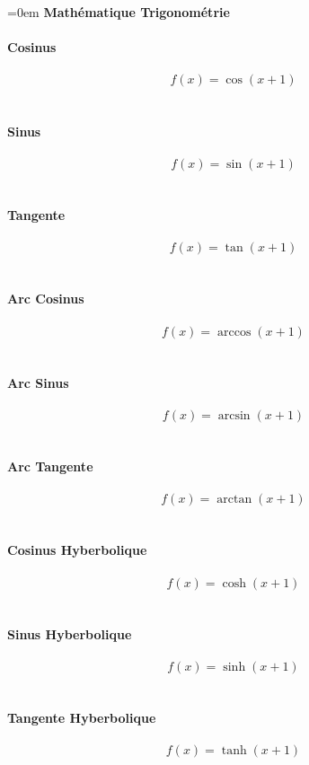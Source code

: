 \documentclass{article}
\begin{document}
\parindent=0em
\textbf{Mathématique Trigonométrie} \\ \\
\textbf{Cosinus} \\ \\
$$f(x)=\cos(x+1)$$ \\ \\
\textbf{Sinus} \\ \\
$$f(x)=\sin(x+1)$$ \\ \\
\textbf{Tangente} \\ \\
$$f(x)=\tan(x+1)$$ \\ \\
\textbf{Arc Cosinus} \\ \\
$$f(x)=\arccos(x+1)$$ \\ \\
\textbf{Arc Sinus} \\ \\
$$f(x)=\arcsin(x+1)$$ \\ \\
\textbf{Arc Tangente} \\ \\
$$f(x)=\arctan(x+1)$$ \\ \\
\textbf{Cosinus Hyberbolique} \\ \\
$$f(x)=\cosh(x+1)$$ \\ \\
\textbf{Sinus Hyberbolique} \\ \\
$$f(x)=\sinh(x+1)$$ \\ \\
\textbf{Tangente Hyberbolique} \\ \\
$$f(x)=\tanh(x+1)$$ \\ \\
\end{document}
